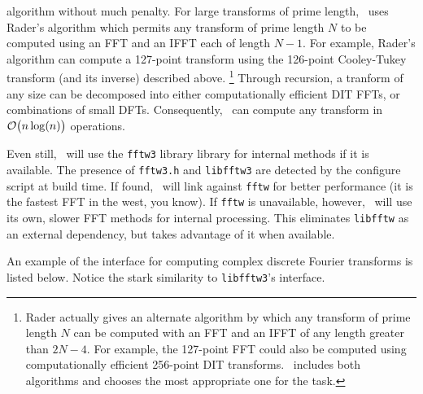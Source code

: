 algorithm without much penalty.
For large transforms of prime length, \liquid\ uses Rader's algorithm
\cite{Rader:1968}
which permits any transform of prime length $N$ to be computed using
an FFT and an IFFT each of length $N-1$.
For example, Rader's algorithm can compute a 127-point transform using
the 126-point Cooley-Tukey transform (and its inverse) described above.%
\footnote{Rader actually gives an alternate algorithm by which any
          transform of prime length $N$ can be computed with an FFT and
          an IFFT of any length greater than $2N-4$.
          For example, the 127-point FFT could also be computed using
          computationally efficient 256-point DIT transforms.
          \liquid\ includes both algorithms and chooses the most
          appropriate one for the task.}
Through recursion, a tranform of any size can be decomposed into either
computationally efficient DIT FFTs, or combinations of small DFTs.
% 
%
Consequently, \liquid\ can compute any transform in
$\mathcal{O}\bigl(n\log(n)\bigr)$ operations.

Even still, \liquid\ will use the {\tt fftw3} library
library \cite{fftw:web} for internal methods if it is available.
The presence of {\tt fftw3.h} and {\tt libfftw3} are detected by the
configure script at build time.
If found, \liquid\ will link against {\tt fftw} for better performance
(it is the fastest FFT in the west, you know).
If {\tt fftw} is unavailable, however, \liquid\ will use its own, slower
FFT methods for internal processing.
This eliminates {\tt libfftw} as an external dependency, but takes
advantage of it when available.

An example of the interface for computing complex discrete Fourier
transforms is listed below.
Notice the stark similarity to {\tt libfftw3}'s interface.
%

%

